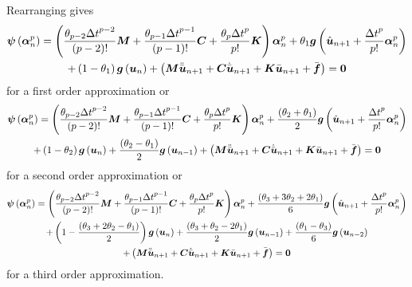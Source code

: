 Rearranging gives
\begin{multline}
  \fnof{\vectr{\psi}}{\vectr{\alpha}^{p}_{n}}=\pbrac{\dfrac{\theta_{p-2}{\Delta
        t}^{p-2}}{\factorial{p-2}}\matr{M}+\dfrac{\theta_{p-1}{\Delta
        t}^{p-1}}{\factorial{p-1}}\matr{C}+\dfrac{\theta_{p}{\Delta
        t}^{p}}{p!}\matr{K}}\vectr{\alpha}^{p}_{n}
  +\theta_{1}\fnof{\vectr{g}}{\hat{\vectr{u}}_{n+1}+ \dfrac{{\Delta
        t}^{p}}{p!}\vectr{\alpha}^{p}_{n}} \\
  +\pbrac{1-\theta_{1}}\fnof{\vectr{g}}{\vectr{u}_{n}}
  +\pbrac{\matr{M}\ddot{\bar{\vectr{u}}}_{n+1}+\matr{C}\dot{\bar{\vectr{u}}}_{n+1}+\matr{K}\bar{\vectr{u}}_{n+1}
    +\bar{\vectr{f}}}= \vectr{0}
  \label{eqn:firstorderdynamic}
\end{multline}
for a first order approximation or
\begin{multline}
  \fnof{\vectr{\psi}}{\vectr{\alpha}^{p}_{n}}=\pbrac{\dfrac{\theta_{p-2}{\Delta
        t}^{p-2}}{\factorial{p-2}}\matr{M}+\dfrac{\theta_{p-1}{\Delta
        t}^{p-1}}{\factorial{p-1}}\matr{C}+\dfrac{\theta_{p}{\Delta
        t}^{p}}{p!}\matr{K}}\vectr{\alpha}^{p}_{n}
  +\dfrac{\pbrac{\theta_{2}+\theta_{1}}}{2}\fnof{\vectr{g}}{\hat{\vectr{u}}_{n+1}+
    \dfrac{{\Delta t}^{p}}{p!}\vectr{\alpha}^{p}_{n}} \\
  +\pbrac{1-\theta_{2}}\fnof{\vectr{g}}{\vectr{u}_{n}}+\dfrac{\pbrac{\theta_{2}-\theta_{1}}}{2}\fnof{\vectr{g}}{\vectr{u}_{n-1}}
  +\pbrac{\matr{M}\ddot{\bar{\vectr{u}}}_{n+1}+\matr{C}\dot{\bar{\vectr{u}}}_{n+1}+\matr{K}\bar{\vectr{u}}_{n+1}
    +\bar{\vectr{f}}}= \vectr{0}
  \label{eqn:secondorderdynamic}
\end{multline}
for a second order approximation or
\begin{multline}
  \fnof{\vectr{\psi}}{\vectr{\alpha}^{p}_{n}}=\pbrac{\dfrac{\theta_{p-2}{\Delta
        t}^{p-2}}{\factorial{p-2}}\matr{M}+\dfrac{\theta_{p-1}{\Delta
        t}^{p-1}}{\factorial{p-1}}\matr{C}+\dfrac{\theta_{p}{\Delta
        t}^{p}}{p!}\matr{K}}\vectr{\alpha}^{p}_{n}+
  \dfrac{\pbrac{\theta_{3}+3\theta_{2}+2\theta_{1}}}{6}\fnof{\vectr{g}}{\hat{\vectr{u}}_{n+1}+
    \dfrac{{\Delta t}^{p}}{p!}\vectr{\alpha}^{p}_{n}} \\
  +\pbrac{1-\dfrac{\pbrac{\theta_{3}+2\theta_{2}-\theta_{1}}}{2}}\fnof{\vectr{g}}{\vectr{u}_{n}}
  +\dfrac{\pbrac{\theta_{3}+\theta_{2}-2\theta_{1}}}{2}\fnof{\vectr{g}}{\vectr{u}_{n-1}}
  +\dfrac{\pbrac{\theta_{1}-\theta_{3}}}{6}\fnof{\vectr{g}}{\vectr{u}_{n-2}} \\
  +\pbrac{\matr{M}\ddot{\bar{\vectr{u}}}_{n+1}+\matr{C}\dot{\bar{\vectr{u}}}_{n+1}+\matr{K}\bar{\vectr{u}}_{n+1}+
    \bar{\vectr{f}}}= \vectr{0}
  \label{eqn:thirdorderdynamic}
\end{multline}
for a third order approximation.

